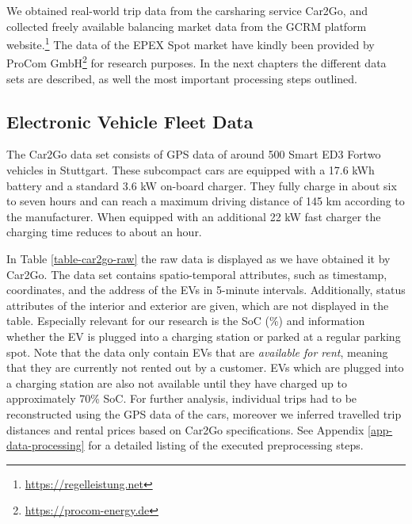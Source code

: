 \documentclass[a4paper, 12pt]{article}
\begin{document}
We obtained real-world trip data from the carsharing service Car2Go, and
collected freely available balancing market data from the GCRM platform
website.\footnote{\url{https://regelleistung.net}} The data of the EPEX Spot market have kindly been provided by
ProCom GmbH\footnote{\url{https://procom-energy.de}} for research purposes. In the next chapters the different
data sets are described, as well the most important processing steps outlined.

\subsection{Electronic Vehicle Fleet Data \label{sec-data-car2go}}
\label{sec:org32046f9}
The Car2Go data set consists of GPS data of around 500 Smart ED3 Fortwo vehicles
in Stuttgart. These subcompact cars are equipped with a 17.6 kWh battery and a
standard 3.6 kW on-board charger. They fully charge in about six to seven hours
and can reach a maximum driving distance of 145 km according to the manufacturer.
When equipped with an additional 22 kW fast charger the charging time reduces to
about an hour.

In Table \ref{table-car2go-raw} the raw data is displayed as we have obtained it
by Car2Go. The data set contains spatio-temporal attributes, such as timestamp,
coordinates, and the address of the EVs in 5-minute intervals. Additionally,
status attributes of the interior and exterior are given, which are not
displayed in the table. Especially relevant for our research is the SoC (\%)
and information whether the EV is plugged into a charging station or parked at a
regular parking spot. Note that the data only contain EVs that are \emph{available
for rent}, meaning that they are currently not rented out by a customer. EVs
which are plugged into a charging station are also not available until they have
charged up to approximately 70\% SoC. For further analysis, individual trips had
to be reconstructed using the GPS data of the cars, moreover we inferred
travelled trip distances and rental prices based on Car2Go specifications. See
Appendix \ref{app-data-processing} for a detailed listing of the executed
preprocessing steps.
\end{document}
